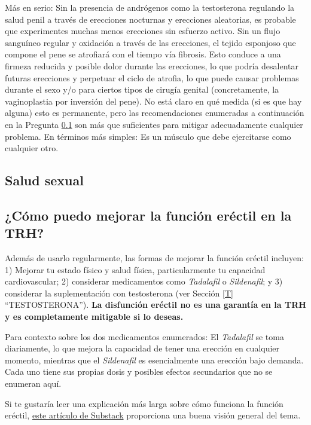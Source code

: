 \documentclass{article}
\begin{document}
Más en serio: Sin la presencia de andrógenos como la testosterona regulando la salud penil a través de erecciones nocturnas y erecciones aleatorias, es probable que experimentes muchas menos erecciones sin esfuerzo activo. Sin un flujo sanguíneo regular y oxidación a través de las erecciones, el tejido esponjoso que compone el pene se atrofiará con el tiempo vía fibrosis. Esto conduce a una firmeza reducida y posible dolor durante las erecciones, lo que podría desalentar futuras erecciones y perpetuar el ciclo de atrofia, lo que puede causar problemas durante el sexo y/o para ciertos tipos de cirugía genital (concretamente, la vaginoplastia por inversión del pene). No está claro en qué medida (si es que hay alguna) esto es permanente, pero las recomendaciones enumeradas a continuación en la Pregunta \ref{11-20} son más que suficientes para mitigar adecuadamente cualquier problema. En términos más simples: Es un músculo que debe ejercitarse como cualquier otro.

\subsection*{Salud sexual}

\subsection{¿Cómo puedo mejorar la función eréctil en la TRH?}\label{11-20}

Además de usarlo regularmente, las formas de mejorar la función eréctil incluyen: 1) Mejorar tu estado físico y salud física, particularmente tu capacidad cardiovascular; 2) considerar medicamentos como \textit{Tadalafil} o \textit{Sildenafil}; y 3) considerar la suplementación con testosterona (ver Sección \ref{T} “TESTOSTERONA”). \textbf{La disfunción eréctil no es una garantía en la TRH y es completamente mitigable si lo deseas.}

Para contexto sobre los dos medicamentos enumerados: El \textit{Tadalafil} se toma diariamente, lo que mejora la capacidad de tener una erección en cualquier momento, mientras que el \textit{Sildenafil} es esencialmente una erección bajo demanda. Cada uno tiene sus propias dosis y posibles efectos secundarios que no se enumeran aquí.

Si te gustaría leer una explicación más larga sobre cómo funciona la función eréctil, \href{https://stainedglasswoman.substack.com/p/how-to-maintain-your-penis-function}{este artículo de Substack} proporciona una buena visión general del tema.
\end{document}
